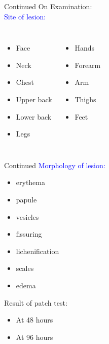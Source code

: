 \documentclass[11pt]{beamer}
\begin{document}
\begin{frame}{Continued}
On Examination:\\
\vspace{5pt}
\textcolor{blue}{Site of lesion:}\\
\begin{columns}
\begin{itemize}
\item Face
\item Neck
\item Chest
\item Upper back
\item Lower back
\item Legs
\end{itemize}
\begin{itemize}
\item Hands
\item Forearm
\item Arm
\item Thighs 
\item Feet
\end{itemize}
\end{columns}

\end{frame}

\begin{frame}{Continued}
\textcolor{blue}{Morphology of lesion:}\\

\begin{itemize}
\item erythema 
\item papule
\item vesicles
\item fissuring
\item lichenification
\item scales
\item edema
\end{itemize}
Result of patch test:\\
\begin{itemize}
\item At 48 hours
\item At 96 hours
\end{itemize}							

\end{frame}
\end{document}
